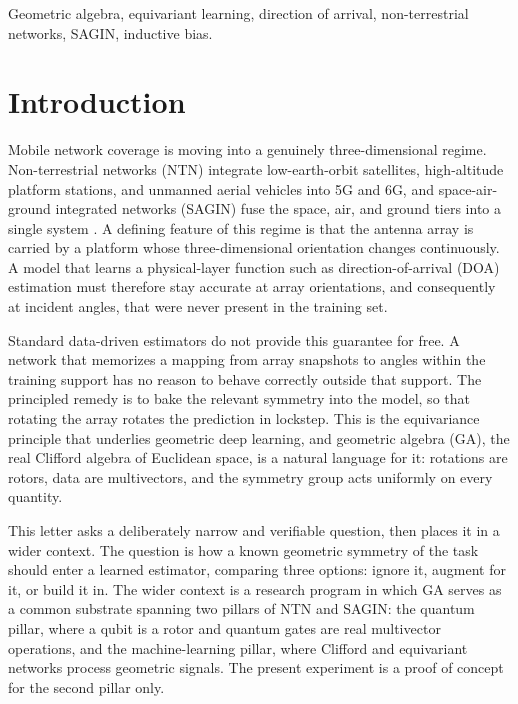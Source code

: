 \documentclass[conference]{IEEEtran}
\begin{document}
\begin{IEEEkeywords}
Geometric algebra, equivariant learning, direction of arrival, non-terrestrial
networks, SAGIN, inductive bias.
\end{IEEEkeywords}


\section{Introduction}
Mobile network coverage is moving into a genuinely three-dimensional regime.
Non-terrestrial networks (NTN) integrate low-earth-orbit satellites, high-altitude
platform stations, and unmanned aerial vehicles into 5G and 6G, and space-air-ground
integrated networks (SAGIN) fuse the space, air, and ground tiers into a single
system \cite{sagin2018}. A defining feature of this regime is that the antenna
array is carried by a platform whose three-dimensional orientation changes
continuously. A model that learns a physical-layer function such as
direction-of-arrival (DOA) estimation must therefore stay accurate at array
orientations, and consequently at incident angles, that were never present in the
training set.

Standard data-driven estimators do not provide this guarantee for free. A network
that memorizes a mapping from array snapshots to angles within the training
support has no reason to behave correctly outside that support. The principled
remedy is to bake the relevant symmetry into the model, so that rotating the array
rotates the prediction in lockstep. This is the equivariance principle that
underlies geometric deep learning, and geometric algebra (GA), the real Clifford
algebra of Euclidean space, is a natural language for it: rotations are rotors,
data are multivectors, and the symmetry group acts uniformly on every quantity.

This letter asks a deliberately narrow and verifiable question, then places it in a
wider context. The question is how a known geometric symmetry of the task should
enter a learned estimator, comparing three options: ignore it, augment for it, or
build it in. The wider context is a research program in which GA serves as a common
substrate spanning two pillars of NTN and SAGIN: the quantum pillar, where a qubit
is a rotor and quantum gates are real multivector operations, and the
machine-learning pillar, where Clifford and equivariant networks process geometric
signals. The present experiment is a proof of concept for the second pillar only.
\end{document}
